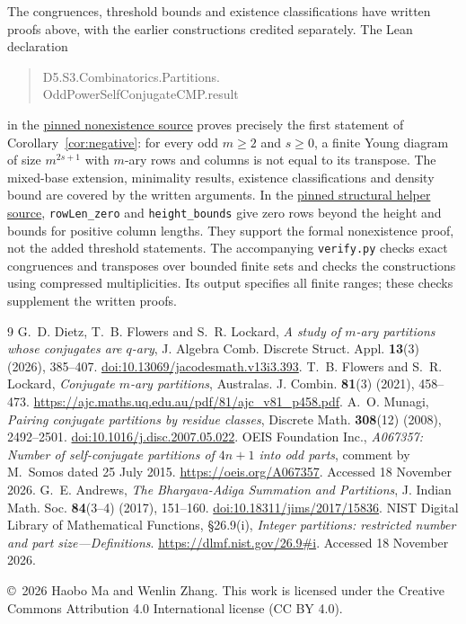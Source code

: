 \documentclass[11pt]{article}
\begin{document}
The congruences, threshold bounds and existence classifications have
written proofs above, with the earlier constructions credited separately.
The Lean declaration
\begin{quote}\small\ttfamily
D5.S3.Combinatorics.Partitions.\\
OddPowerSelfConjugateCMP.result
\end{quote}
in the \href{https://github.com/the-omega-institute/trureturing/blob/8acf7efa41af7fc9ddbbd39571e7ef73462f4509/D5/S3/Combinatorics/Partitions/OddPowerSelfConjugateCMP.lean}{pinned nonexistence source}
proves precisely the first statement of Corollary~\ref{cor:negative}:
for every odd $m\geq2$ and $s\geq0$, a finite Young diagram of size
$m^{2s+1}$ with $m$-ary rows and columns is not equal to its transpose.
The mixed-base extension, minimality results, existence classifications
and density bound are covered by the written arguments.
In the \href{https://github.com/the-omega-institute/trureturing/blob/8acf7efa41af7fc9ddbbd39571e7ef73462f4509/D5/S1/Words/Compositions/StrictFirstSumsGapfreeOddParts.lean}{pinned structural helper source},
\texttt{rowLen\_zero} and \texttt{height\_bounds} give zero rows beyond
the height and bounds for positive column lengths. They support the
formal nonexistence proof, not the added threshold statements.
The accompanying \texttt{verify.py} checks exact congruences and
transposes over bounded finite sets and checks the constructions using
compressed multiplicities. Its output specifies all finite ranges;
these checks supplement the written proofs.

\begin{thebibliography}{9}
 G.~D. Dietz, T.~B. Flowers and S.~R. Lockard,
\emph{A study of $m$-ary partitions whose conjugates are $q$-ary},
J. Algebra Comb. Discrete Struct. Appl. \textbf{13}(3) (2026), 385--407.
\href{https://doi.org/10.13069/jacodesmath.v13i3.393}{doi:10.13069/jacodesmath.v13i3.393}.
 T.~B. Flowers and S.~R. Lockard,
\emph{Conjugate $m$-ary partitions}, Australas. J. Combin.
\textbf{81}(3) (2021), 458--473.
\url{https://ajc.maths.uq.edu.au/pdf/81/ajc_v81_p458.pdf}.
 A.~O. Munagi, \emph{Pairing conjugate partitions by
residue classes}, Discrete Math. \textbf{308}(12) (2008), 2492--2501.
\href{https://doi.org/10.1016/j.disc.2007.05.022}{doi:10.1016/j.disc.2007.05.022}.
 OEIS Foundation Inc., \emph{A067357: Number of
self-conjugate partitions of $4n+1$ into odd parts},
comment by M.~Somos dated 25 July 2015.
\url{https://oeis.org/A067357}. Accessed 18 November 2026.
 G.~E. Andrews, \emph{The Bhargava-Adiga Summation
and Partitions}, J. Indian Math. Soc. \textbf{84}(3--4) (2017), 151--160.
\href{https://doi.org/10.18311/jims/2017/15836}{doi:10.18311/jims/2017/15836}.
 NIST Digital Library of Mathematical Functions,
\S26.9(i), \emph{Integer partitions: restricted number and part size---Definitions}.
\url{https://dlmf.nist.gov/26.9#i}. Accessed 18 November 2026.
\end{thebibliography}
\medskip
\noindent\small \copyright\ 2026 Haobo Ma and Wenlin Zhang.
This work is licensed under the Creative Commons Attribution 4.0
International license (CC BY 4.0).
\end{document}
